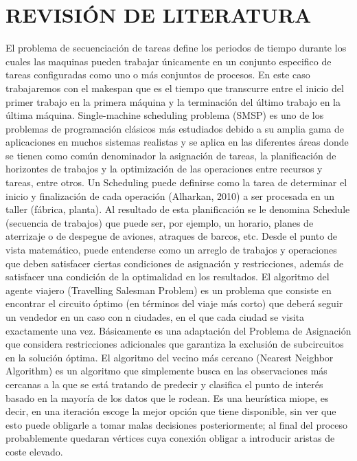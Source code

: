 \documentclass[twocolumn,10pt]{article}
\begin{document}
\section{REVISIÓN DE LITERATURA}
El problema de secuenciación de tareas define los periodos de tiempo durante los cuales las maquinas pueden trabajar únicamente en un conjunto especifico de tareas configuradas como uno o más conjuntos de procesos. En este caso trabajaremos con el makespan que es el tiempo que transcurre entre el inicio del primer trabajo en la primera máquina y la terminación del último trabajo en la última máquina. Single-machine scheduling problema (SMSP) es uno de los problemas de programación clásicos más estudiados debido a su amplia gama de aplicaciones en muchos sistemas realistas y se aplica en las diferentes áreas donde se tienen como común denominador la asignación de tareas, la planificación de horizontes de trabajos y la optimización de las operaciones entre recursos y tareas, entre otros\cite{Ying}. 
Un Scheduling puede definirse como la tarea de determinar el inicio y finalización de cada operación (Alharkan, 2010) a ser procesada en un taller (fábrica, planta). Al resultado de esta planificación se le denomina Schedule (secuencia de trabajos) que puede ser, por ejemplo, un horario, planes de aterrizaje o de despegue de aviones, atraques de barcos, etc. Desde el punto de vista matemático, puede entenderse como un arreglo de trabajos y operaciones que deben satisfacer ciertas condiciones de asignación y restricciones, además de satisfacer una condición de la optimalidad en los resultados\cite{Senthilkumar}.
El algoritmo del agente viajero (Travelling Salesman Problem) es un problema que consiste en encontrar el circuito óptimo (en términos del viaje más corto) que deberá seguir un vendedor en un caso con n ciudades, en el que cada ciudad se visita exactamente una vez. Básicamente es una adaptación del Problema de Asignación que considera restricciones adicionales que garantiza la exclusión de subcircuitos en la solución óptima\cite{GeeksforGeeks}.
El algoritmo del vecino más cercano (Nearest Neighbor Algorithm) es un algoritmo que simplemente busca en las observaciones más cercanas a la que se está tratando de predecir y clasifica el punto de interés basado en la mayoría de los datos que le rodean. Es una heurística miope, es decir, en una iteración escoge la mejor opción que tiene disponible, sin ver que esto puede obligarle a tomar malas decisiones posteriormente; al final del proceso probablemente quedaran vértices cuya conexión obligar a introducir aristas de coste elevado.
\end{document}
